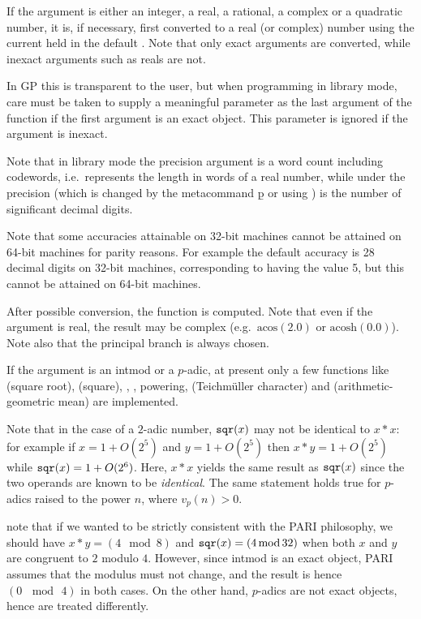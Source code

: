 \item If the argument is either an integer, a real, a rational, a complex
or a quadratic number, it is, if necessary, first converted to a real (or
complex) number using the current  held in the default
. Note that only exact arguments are converted, while
inexact arguments such as reals are not.

In GP this is transparent to the user, but when programming in library
mode, care must be taken to supply a meaningful parameter  as the
last argument of the function if the first argument is an exact object.
This parameter is ignored if the argument is inexact.

   Note that in library mode the precision argument  is a word
count including codewords, i.e.~represents the length in words of a real
number, while under  the precision (which is changed by the metacommand
\b{p} or using ) is the number of significant
decimal digits.

Note that some accuracies attainable on 32-bit machines cannot be attained
on 64-bit machines for parity reasons. For example the default  accuracy
is 28 decimal digits on 32-bit machines, corresponding to  having
the value 5, but this cannot be attained on 64-bit machines.\smallskip

After possible conversion, the function is computed. Note that even if the
argument is real, the result may be complex (e.g.~$\text{acos}(2.0)$ or
$\text{acosh}(0.0)$). Note also that the principal branch is always chosen.

\item If the argument is an intmod or a $p$-adic, at present only a
few functions like  (square root),  (square), ,
, powering,  (Teichm\"uller character) and
 (arithmetic-geometric mean) are implemented.

Note that in the case of a $2$-adic number, ${\tt sqr}(x)$ may not be
identical to $x*x$: for example if $x = 1+O(2^5)$ and $y = 1+O(2^5)$ then
$x*y = 1+O(2^5)$ while ${\tt sqr}(x) = 1+O(2^6)$. Here, $x * x$ yields the
same result as ${\tt sqr}(x)$ since the two operands are known to be
\emph{identical}. The same statement holds true for $p$-adics raised to the
power $n$, where $v_p(n) > 0$.

 note that if we wanted to be strictly consistent with
the PARI philosophy, we should have $x*y = (4 \mod 8)$ and ${\tt sqr}(x) =
(4 \,{\rm mod}\, 32)$ when both $x$ and $y$ are congruent to $2$ modulo $4$.
However, since intmod is an exact object, PARI assumes that the modulus
must not change, and the result is hence $(0\, \mod\, 4)$ in both cases. On
the other hand, $p$-adics are not exact objects, hence are treated
differently.

